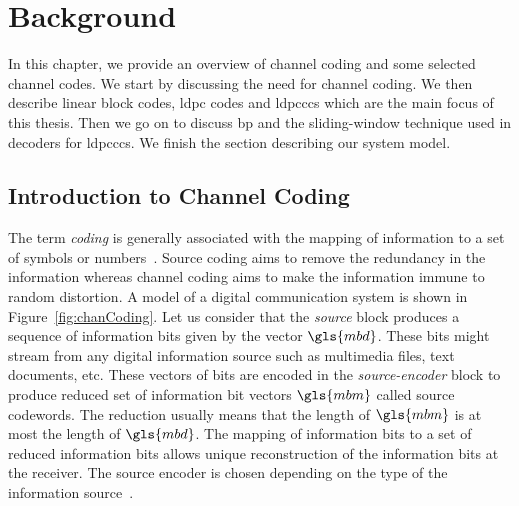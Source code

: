 \chapter{Background}\label{ch:back}
In this chapter, we provide an overview of channel coding and some selected channel codes. We start by discussing the need for channel coding. We then describe linear block codes, \gls{ldpc} codes and \glspl{ldpccc} which are the main focus of this thesis. Then we go on to discuss \gls{bp} and the sliding-window technique used in decoders for \glspl{ldpccc}. We finish the section describing our system model.

\section{Introduction to Channel Coding}
The term \emph{coding} is generally associated with the mapping of information to a set of symbols or numbers~\cite{Bossert}. Source coding aims to remove the redundancy in the information whereas channel coding aims to make the information immune to random distortion. A model of a digital communication system is shown in Figure~\ref{fig:chanCoding}. Let us consider that the \emph{source} block produces a sequence of information bits given by the vector $\gls{mbd}$. These bits might stream from any digital information source such as multimedia files, text documents, etc. These vectors of bits are encoded in the \emph{source-encoder} block to produce reduced set of information bit vectors $\gls{mbm}$ called source codewords. The reduction usually means that the length of $\gls{mbm}$ is at most the length of $\gls{mbd}$. The mapping of information bits to a set of reduced information bits allows unique reconstruction of the information bits at the receiver. The source encoder is chosen depending on the type of the information source~\cite{proak}.

